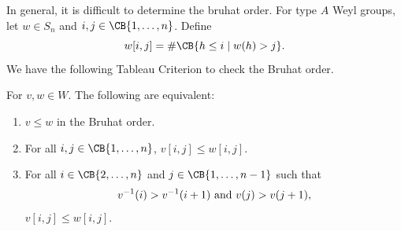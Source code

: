 \begin{example}[exp:]{}
\end{example}

In general, it is difficult to determine the bruhat order.
For type $A$ Weyl groups, let $w\in S_n$ and $i,j\in \CB{1,\dots ,n}$. Define
\[
    w[i,j]=\#\CB{h\leq i\mid w(h)>j}.
\]
We have the following Tableau Criterion to check the Bruhat order.

\begin{theorem}[thm:]{}
    For $v,w\in W$. The following are equivalent:
    \begin{enumerate}
        \item $v\leq w$ in the Bruhat order.
        \item For all $i,j\in \CB{1,\dots ,n}$, $v[i,j]\leq w[i,j]$.
        \item For all $i\in \CB{2,\dots ,n}$ and $j\in \CB{1,\dots ,n-1}$ such that
            \[
                v^{-1}(i)>v^{-1}(i+1)\textnormal{ and }v(j)>v(j+1),
            \]
            $v[i,j]\leq w[i,j]$.
    \end{enumerate}
\end{theorem}

\begin{example}[exp:]{}
\end{example}




